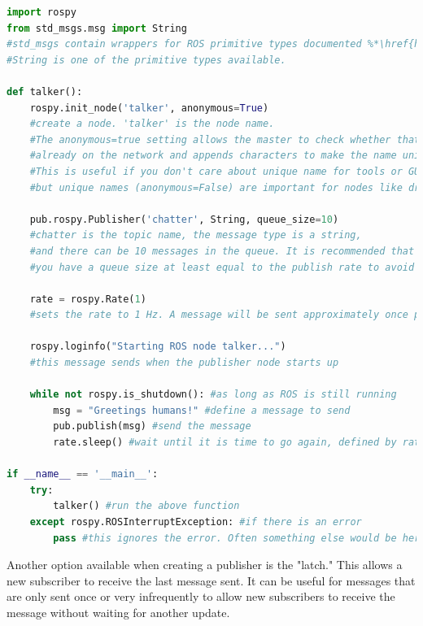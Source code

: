 \documentclass[twoside]{article}
\begin{document}
\begin{lstlisting}[language=python]
import rospy
from std_msgs.msg import String
#std_msgs contain wrappers for ROS primitive types documented %*\href{http://wiki.ros.org/std_msgs}{here}%*. 
#String is one of the primitive types available.

def talker():
    rospy.init_node('talker', anonymous=True)
    #create a node. 'talker' is the node name.
    #The anonymous=true setting allows the master to check whether that name exists
    #already on the network and appends characters to make the name unique.
    #This is useful if you don't care about unique name for tools or GUIs, 
    #but unique names (anonymous=False) are important for nodes like drivers.

    pub.rospy.Publisher('chatter', String, queue_size=10)
    #chatter is the topic name, the message type is a string,
    #and there can be 10 messages in the queue. It is recommended that
    #you have a queue size at least equal to the publish rate to avoid missed messages.

    rate = rospy.Rate(1)
    #sets the rate to 1 Hz. A message will be sent approximately once per second

    rospy.loginfo("Starting ROS node talker...")
    #this message sends when the publisher node starts up

    while not rospy.is_shutdown(): #as long as ROS is still running
        msg = "Greetings humans!" #define a message to send
        pub.publish(msg) #send the message
        rate.sleep() #wait until it is time to go again, defined by rate

if __name__ == '__main__':
    try:
        talker() #run the above function
    except rospy.ROSInterruptException: #if there is an error
        pass #this ignores the error. Often something else would be here

\end{lstlisting}

Another option available when creating a publisher is the "latch." This allows a new subscriber to receive the last message sent. It can be useful for messages that are only sent once or very infrequently to allow new subscribers to receive the message without waiting for another update.
\end{document}
